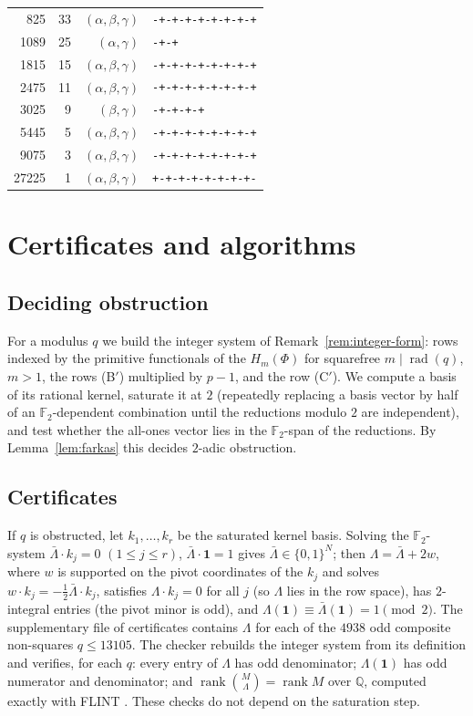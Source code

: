 \documentclass[11pt]{amsart}
\theoremstyle{definition}
\theoremstyle{remark}
\providecommand{\Q}{\mathbb Q}
\newcommand{\F}{\mathbb F}
\DeclareMathOperator{\rad}{rad}
\numberwithin{equation}{section}
\begin{document}
\begin{longtable}{rrrl}
825 & 33 & $(\alpha,\beta,\gamma)$ & \texttt{-+-+-+-+-+-+-+-+}\\
1089 & 25 & $(\alpha,\gamma)$ & \texttt{-+-+}\\
1815 & 15 & $(\alpha,\beta,\gamma)$ & \texttt{-+-+-+-+-+-+-+-+}\\
2475 & 11 & $(\alpha,\beta,\gamma)$ & \texttt{-+-+-+-+-+-+-+-+}\\
3025 & 9 & $(\beta,\gamma)$ & \texttt{-+-+-+-+}\\
5445 & 5 & $(\alpha,\beta,\gamma)$ & \texttt{-+-+-+-+-+-+-+-+}\\
9075 & 3 & $(\alpha,\beta,\gamma)$ & \texttt{-+-+-+-+-+-+-+-+}\\
27225 & 1 & $(\alpha,\beta,\gamma)$ & \texttt{+-+-+-+-+-+-+-+-}\\
\bottomrule\end{longtable}


\section{Certificates and algorithms}\label{app:cert}

\subsection*{Deciding obstruction}
For a modulus $q$ we build the integer system of Remark~\ref{rem:integer-form}: rows indexed by the primitive functionals of the $H_m(\Phi)$ for squarefree $m\mid\rad(q)$, $m>1$, the rows (B$'$) multiplied by $p-1$, and the row (C$'$).
We compute a basis of its rational kernel, saturate it at $2$ (repeatedly replacing a basis vector by half of an $\F_2$-dependent combination until the reductions modulo $2$ are independent), and test whether the all-ones vector lies in the $\F_2$-span of the reductions.
By Lemma~\ref{lem:farkas} this decides $2$-adic obstruction.

\subsection*{Certificates}
If $q$ is obstructed, let $k_1,\dots,k_r$ be the saturated kernel basis.
Solving the $\F_2$-system $\bar\Lambda\cdot k_j=0$ $(1\le j\le r)$, $\bar\Lambda\cdot\mathbf1=1$ gives $\bar\Lambda\in\{0,1\}^N$; then $\Lambda=\bar\Lambda+2w$, where $w$ is supported on the pivot coordinates of the $k_j$ and solves $w\cdot k_j=-\frac12\bar\Lambda\cdot k_j$, satisfies $\Lambda\cdot k_j=0$ for all $j$ (so $\Lambda$ lies in the row space), has $2$-integral entries (the pivot minor is odd), and $\Lambda(\mathbf1)\equiv\bar\Lambda(\mathbf1)=1\pmod 2$.
The supplementary file of certificates contains $\Lambda$ for each of the $4938$ odd composite non-squares $q\le 13105$.
The checker rebuilds the integer system from its definition and verifies, for each $q$: every entry of $\Lambda$ has odd denominator; $\Lambda(\mathbf1)$ has odd numerator and denominator; and $\operatorname{rank}\binom{M}{\Lambda}=\operatorname{rank}M$ over $\Q$, computed exactly with FLINT \cite{FLINT}.
These checks do not depend on the saturation step.
\end{document}
